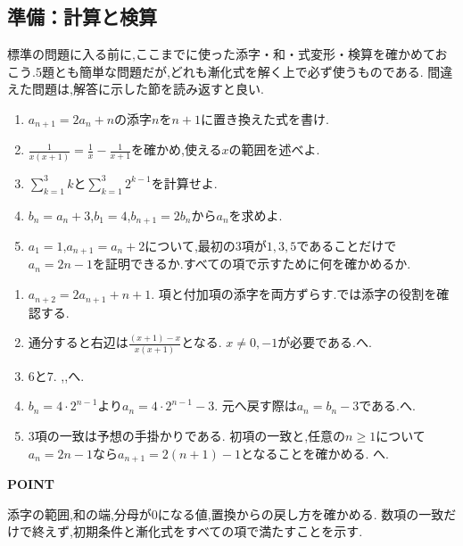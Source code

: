 \subsection{準備：計算と検算}\label{節：計算と検算}
標準の問題に入る前に,ここまでに使った添字・和・式変形・検算を確かめておこう.5題とも簡単な問題だが,どれも漸化式を解く上で必ず使うものである.
間違えた問題は,解答に示した節を読み返すと良い.

\noindent{}\par\nobreak
\begin{enumerate}[format=\bookitemlink{reading-check}{problem}{answer}]
  \item $a_{n+1}=2a_n+n$の添字$n$を$n+1$に置き換えた式を書け.
  \item $\frac1{x(x+1)}=\frac1x-\frac1{x+1}$を確かめ,使える$x$の範囲を述べよ.
  \item $\sum_{k=1}^{3}k$と$\sum_{k=1}^{3}2^{k-1}$を計算せよ.
  \item $b_n=a_n+3$,$b_1=4$,$b_{n+1}=2b_n$から$a_n$を求めよ.
  \item $a_1=1$,$a_{n+1}=a_n+2$について,最初の3項が$1,3,5$であることだけで$a_n=2n-1$を証明できるか.すべての項で示すために何を確かめるか.
\end{enumerate}

\noindent{}\par\nobreak
\begin{enumerate}[format=\bookitemlink{reading-check}{answer}{problem}]
  \item $a_{n+2}=2a_{n+1}+n+1$.
    項と付加項の添字を両方ずらす.では添字の役割を確認する.
  \item 通分すると右辺は$\frac{(x+1)-x}{x(x+1)}$となる.
    $x\ne0,-1$が必要である.へ.
  \item $6$と$7$.
    ,,へ.
  \item $b_n=4\cdot2^{n-1}$より$a_n=4\cdot2^{n-1}-3$.
    元へ戻す際は$a_n=b_n-3$である.へ.
  \item 3項の一致は予想の手掛かりである.
    初項の一致と,任意の$n\ge1$について$a_n=2n-1$なら$a_{n+1}=2(n+1)-1$となることを確かめる.
    へ.
\end{enumerate}

\begin{bookpoint}
  \textbf{POINT}\par
  添字の範囲,和の端,分母が0になる値,置換からの戻し方を確かめる.
  数項の一致だけで終えず,初期条件と漸化式をすべての項で満たすことを示す.
\end{bookpoint}
